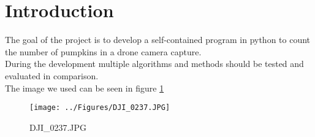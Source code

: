 \documentclass[../Head/Main.tex]{subfiles}
\begin{document}
\section{Introduction}

The goal of the project is to develop a self-contained program in python to count the number of pumpkins in a drone camera capture.\\
During the development multiple algorithms and methods should be tested and evaluated in comparison.\\

The image we used can be seen in figure \ref{fig:DJI_0237}

\begin{figure}[H]
	\centering
	\texttt{[image: ../Figures/DJI\_0237.JPG]}
	\caption{DJI\_0237.JPG}
	\label{fig:DJI_0237}
\end{figure}
\end{document}
